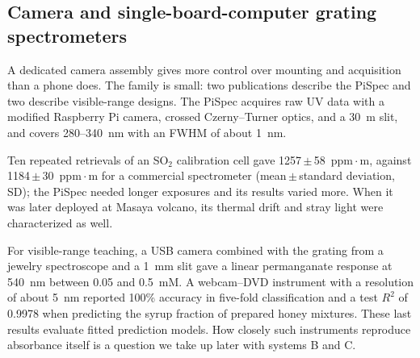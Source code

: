 \subsection{Camera and single-board-computer grating spectrometers}

A dedicated camera assembly gives more control over mounting and acquisition than a phone does. The family is small: two publications describe the PiSpec and two describe visible-range designs. The PiSpec acquires raw UV data with a modified Raspberry Pi camera, crossed Czerny--Turner optics, and a 30~\textmu m slit, and covers 280--340~nm with an FWHM of about 1~nm.\citep{wilkes2017low,wilkes2019pispec}

Ten repeated retrievals of an SO$_2$ calibration cell gave 1257\,$\pm$\,58~ppm\,$\cdot$\,m, against 1184\,$\pm$\,30~ppm\,$\cdot$\,m for a commercial spectrometer (mean\,$\pm$\,standard deviation, SD); the PiSpec needed longer exposures and its results varied more.\citep{wilkes2017low,wilkes2019pispec} When it was later deployed at Masaya volcano, its thermal drift and stray light were characterized as well.\citep{wilkes2019pispec}

For visible-range teaching, a USB camera combined with the grating from a jewelry spectroscope and a 1~mm slit gave a linear permanganate response at 540~nm between 0.05 and 0.5~mM.\citep{delmonache2025multipurpose} A webcam--DVD instrument with a resolution of about 5~nm reported 100\% accuracy in five-fold classification and a test $R^2$ of 0.9978 when predicting the syrup fraction of prepared honey mixtures.\citep{suhendar2025webcam} These last results evaluate fitted prediction models. How closely such instruments reproduce absorbance itself is a question we take up later with systems B and C.
